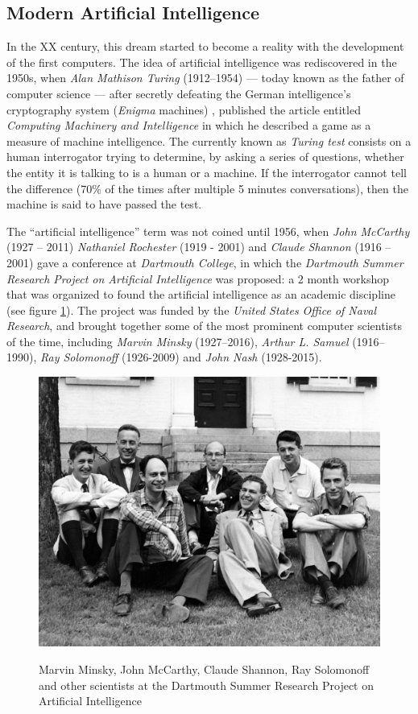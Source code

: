 \subsection{Modern Artificial Intelligence}
In the XX century, this dream started to become a reality with the development of the first computers. The idea of artificial intelligence was rediscovered in the 1950s, when \textit{Alan Mathison Turing} (1912–1954) — today known as the father of computer science — after secretly defeating the German intelligence's cryptography system (\textit{Enigma} machines) \cite{Hodges:2000}, published the article entitled \textit{Computing Machinery and Intelligence} \cite{turing1950} in which he described a game as a measure of machine intelligence. The currently known as \textit{Turing test} consists on a human interrogator trying to determine, by asking a series of questions, whether the entity it is talking to is a human or a machine. If the interrogator cannot tell the difference (70\% of the times after multiple 5 minutes conversations), then the machine is said to have passed the test.



The ``artificial intelligence'' term was not coined until 1956, when \textit{John McCarthy} (1927 – 2011) \textit{Nathaniel Rochester} (1919 - 2001) and \textit{Claude Shannon} (1916 – 2001) gave a conference at \textit{Dartmouth College}, in which the \textit{Dartmouth Summer Research Project on Artificial Intelligence} was proposed: a 2 month workshop that was organized to found the artificial intelligence as an academic discipline (see figure \ref{fig:dartmouth}). The project was funded by the \textit{United States Office of Naval Research}, and brought together some of the most prominent computer scientists of the time, including \textit{Marvin Minsky} (1927–2016), \textit{Arthur L. Samuel} (1916–1990), \textit{Ray Solomonoff} (1926-2009) and \textit{John Nash} (1928-2015).

\begin{figure}[!htb]
	\centering
	\includegraphics[width=.6\textwidth]{chapter1/images/dartmouth.jpg}
	\label{fig:dartmouth}
	\caption{Marvin Minsky, John McCarthy, Claude Shannon, Ray Solomonoff and other scientists at the Dartmouth Summer Research Project on Artificial Intelligence}
\end{figure}


